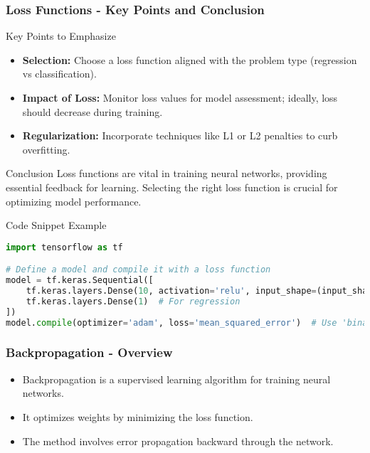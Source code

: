 \documentclass[aspectratio=169]{beamer}
\begin{document}
\begin{frame}[fragile]
  \frametitle{Loss Functions - Key Points and Conclusion}
  \begin{block}{Key Points to Emphasize}
    \begin{itemize}
      \item \textbf{Selection:} Choose a loss function aligned with the problem type (regression vs classification).
      \item \textbf{Impact of Loss:} Monitor loss values for model assessment; ideally, loss should decrease during training.
      \item \textbf{Regularization:} Incorporate techniques like L1 or L2 penalties to curb overfitting.
    \end{itemize}
  \end{block}
  
  \begin{block}{Conclusion}
    Loss functions are vital in training neural networks, providing essential feedback for learning. Selecting the right loss function is crucial for optimizing model performance.
  \end{block}
  
  \begin{block}{Code Snippet Example}
  \begin{lstlisting}[language=Python]
import tensorflow as tf

# Define a model and compile it with a loss function
model = tf.keras.Sequential([
    tf.keras.layers.Dense(10, activation='relu', input_shape=(input_shape,)),
    tf.keras.layers.Dense(1)  # For regression
])
model.compile(optimizer='adam', loss='mean_squared_error')  # Use 'binary_crossentropy' for binary classification
  \end{lstlisting}
  \end{block}
\end{frame}

\begin{frame}[fragile]
    \frametitle{Backpropagation - Overview}
    \begin{itemize}
        \item Backpropagation is a supervised learning algorithm for training neural networks.
        \item It optimizes weights by minimizing the loss function.
        \item The method involves error propagation backward through the network.
    \end{itemize}
\end{frame}
\end{document}

